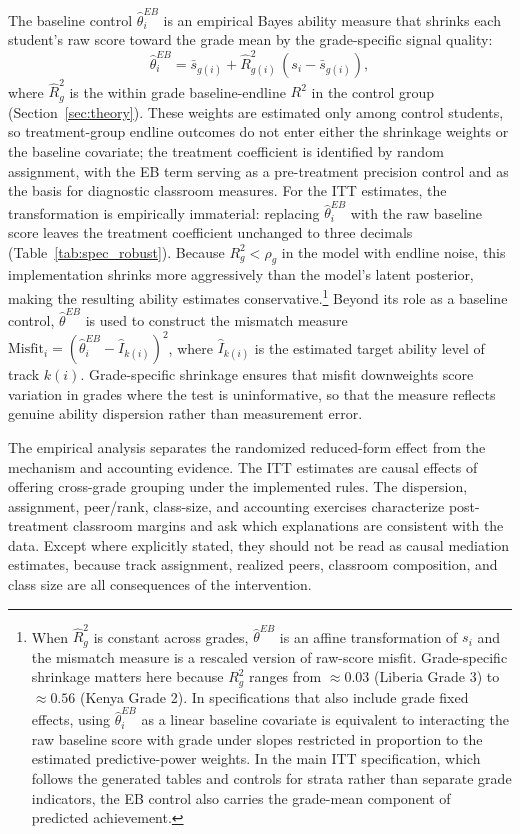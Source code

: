 \documentclass[11pt]{article}
\begin{document}
The baseline control $\hat{\theta}^{EB}_i$ is an empirical Bayes ability measure that shrinks each student's raw score toward the grade mean by the grade-specific signal quality:
\begin{equation}
\label{eq:eb}
\hat{\theta}^{EB}_{i} = \bar{s}_{g(i)} + \widehat{R}^2_{g(i)}\,(s_i - \bar{s}_{g(i)}),
\end{equation}
where $\widehat{R}^2_g$ is the within grade baseline-endline $R^2$ in the control group (Section~\ref{sec:theory}). These weights are estimated only among control students, so treatment-group endline outcomes do not enter either the shrinkage weights or the baseline covariate; the treatment coefficient is identified by random assignment, with the EB term serving as a pre-treatment precision control and as the basis for diagnostic classroom measures. For the ITT estimates, the transformation is empirically immaterial: replacing $\hat{\theta}^{EB}_i$ with the raw baseline score leaves the treatment coefficient unchanged to three decimals (Table~\ref{tab:spec_robust}). Because $R^2_g < \rho_g$ in the model with endline noise, this implementation shrinks more aggressively than the model's latent posterior, making the resulting ability estimates conservative.\footnote{When $\widehat{R}^2_g$ is constant across grades, $\hat{\theta}^{EB}$ is an affine transformation of $s_i$ and the mismatch measure is a rescaled version of raw-score misfit. Grade-specific shrinkage matters here because $R^2_g$ ranges from $\approx 0.03$ (Liberia Grade 3) to $\approx 0.56$ (Kenya Grade 2). In specifications that also include grade fixed effects, using $\hat{\theta}^{EB}_i$ as a linear baseline covariate is equivalent to interacting the raw baseline score with grade under slopes restricted in proportion to the estimated predictive-power weights. In the main ITT specification, which follows the generated tables and controls for strata rather than separate grade indicators, the EB control also carries the grade-mean component of predicted achievement.} Beyond its role as a baseline control, $\hat{\theta}^{EB}$ is used to construct the mismatch measure $\text{Misfit}_i = (\hat{\theta}^{EB}_i - \widehat{I}_{k(i)})^2$, where $\widehat{I}_{k(i)}$ is the estimated target ability level of track $k(i)$. Grade-specific shrinkage ensures that misfit downweights score variation in grades where the test is uninformative, so that the measure reflects genuine ability dispersion rather than measurement error.

The empirical analysis separates the randomized reduced-form effect from the mechanism and accounting evidence. The ITT estimates are causal effects of offering cross-grade grouping under the implemented rules. The dispersion, assignment, peer/rank, class-size, and accounting exercises characterize post-treatment classroom margins and ask which explanations are consistent with the data. Except where explicitly stated, they should not be read as causal mediation estimates, because track assignment, realized peers, classroom composition, and class size are all consequences of the intervention.
\end{document}

